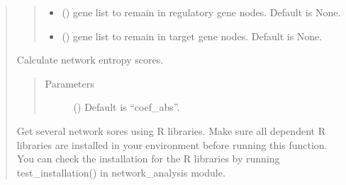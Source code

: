 \documentclass[letterpaper,10pt,english]{sphinxmanual}
\begin{document}
\begin{quote}
\begin{fulllineitems}
\begin{fulllineitems}
\begin{quote}
\begin{description}
\begin{itemize}
\item {} 
 () \textendash{} gene list to remain in regulatory gene nodes. Default is None.

\item {} 
 () \textendash{} gene list to remain in target gene nodes. Default is None.

\end{itemize}

\end{description}\end{quote}

\end{fulllineitems}


\begin{fulllineitems}
\label{\detokenize{modules/celloracle.network_analysis:celloracle.network_analysis.Links.get_network_entropy}}
Calculate network entropy scores.
\begin{quote}\begin{description}
\item[{Parameters}] \leavevmode
{} () \textendash{} Default is “coef\_abs”.

\end{description}\end{quote}

\end{fulllineitems}


\begin{fulllineitems}
\label{\detokenize{modules/celloracle.network_analysis:celloracle.network_analysis.Links.get_score}}
Get several network sores using R libraries.
Make sure all dependent R libraries are installed in your environment before running this function.
You can check the installation for the R libraries by running test\_installation() in network\_analysis module.


\end{fulllineitems}
\end{fulllineitems}
\end{quote}
\end{document}
